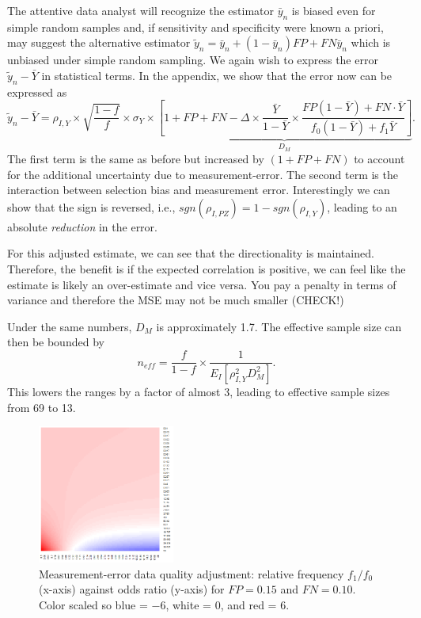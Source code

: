 \documentclass[aoas]{amsart}
\begin{document}
The attentive data analyst will recognize the estimator $\bar y_n$ is biased even for simple random samples and, if sensitivity and specificity were known a priori, may suggest the alternative estimator $\tilde y_n = \bar y_n + (1-\bar y_n) FP + FN \bar y_n$ which is unbiased under simple random sampling. We again wish to express the error $\tilde  y_n - \bar Y$ in statistical terms. In the appendix, we show that the error now can be expressed as
$$
\tilde y_n - \bar Y = \rho_{I,Y} \times \sqrt{\frac{1-f}{f}} \times \sigma_{Y}
\times \underbrace{\left[ 1 + FP + FN - \Delta \times \frac{\bar Y}{1-\bar Y} \times \frac{FP(1-\bar Y) + FN \cdot \bar Y}{f_0 (1-\bar Y) + f_1 \bar Y} \right]}_{D_M}.
$$
The first term is the same as before but increased by $(1 + FP + FN)$ to account for the additional uncertainty due to measurement-error.  The second term is the interaction between selection bias and measurement error.  Interestingly we can show that the sign is reversed, i.e., $sgn(\rho_{I,PZ}) = 1 - sgn(\rho_{I,Y})$, leading to an absolute \emph{reduction} in the error.

For this adjusted estimate, we can see that the directionality is maintained.  Therefore, the benefit is if the expected correlation is positive, we can feel like the estimate is likely an over-estimate and vice versa.  You pay a penalty in terms of variance and therefore the MSE may not be much smaller (CHECK!)

Under the same numbers, $D_M$ is approximately 1.7.  The effective sample size can then be bounded by
$$
n_{eff} = \frac{f}{1-f} \times \frac{1}{E_{I} \left[ \rho_{I,Y}^2 D_M^2 \right]}.
$$
This lowers the ranges by a factor of almost $3$, leading to effective sample sizes from 69 to 13.


\begin{figure}
\centering
\includegraphics[width = 0.4\textwidth]{../methods/figs/mem_heatmap_article.png}
\caption{Measurement-error data quality adjustment: relative frequency $f_1/f_0$ (x-axis) against odds ratio (y-axis) for $FP=0.15$ and $FN=0.10$. Color scaled so blue = $-6$, white = 0, and red = $6$.}
\label{fig:heatmap}
\vspace{-0.3cm}
\end{figure}
\end{document}
